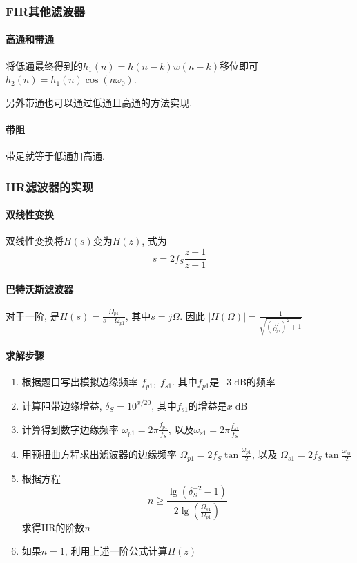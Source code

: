 \documentclass{ctexart}
\begin{document}
\subsubsection{FIR其他滤波器}
\paragraph{高通和带通} 将低通最终得到的$h_1(n) = h(n-k)w(n-k)$移位即可$h_2(n) = h_1(n) \cos(n\omega_0)$.\par
    另外带通也可以通过低通且高通的方法实现.
\paragraph{带阻} 带足就等于低通加高通.
\subsubsection{IIR滤波器的实现}
\paragraph{双线性变换} 双线性变换将$H(s)$变为$H(z)$, 式为\[
        s = 2 f_S \frac{z-1}{z+1}\]
\paragraph{巴特沃斯滤波器}
    对于一阶, 是$H(s) = \frac{\Omega_{p1}}{s + \Omega_{p1}}$, 其中$s = j \Omega$.
    因此 $|H(\Omega)| = \frac{1}{\sqrt{\left(\frac{\Omega}{\Omega_{p1}}\right)^2 + 1}}$
\paragraph{求解步骤}
    \begin{enumerate}
        \item 根据题目写出模拟边缘频率 $f_{p1},\;f_{s1}$.
            其中$f_{p1}$是$-3 \;\textrm{dB}$的频率
        \item 计算阻带边缘增益, $\delta_S = 10^{x/20}$,
            其中$f_{s1}$的增益是$x \;\textrm{dB}$
        \item 计算得到数字边缘频率 $\omega_{p1} = 2\pi \frac{f_{p1}}{f_S}$,
            以及$\omega_{s1} = 2\pi \frac{f_{s1}}{f_S}$
        \item 用预扭曲方程求出滤波器的边缘频率
            $\Omega_{p1} = 2 f_S \tan \frac{\omega_{p1}}{2}$,
            以及
            $\Omega_{s1} = 2 f_S \tan \frac{\omega_{s1}}{2}$
        \item 根据方程\[
                n \ge \frac
                    { \lg\left(\delta_S^{-2} - 1\right)  }
                    { 2 \lg\left( \frac{\Omega_{s1}}{\Omega_{p1}}\right)} \]
            求得IIR的阶数$n$
        \item 如果$n = 1$, 利用上述一阶公式计算$H(z)$
    \end{enumerate}
\end{document}
